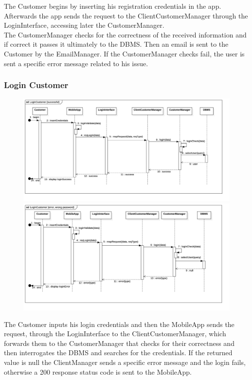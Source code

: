The Customer begins by inserting his registration credentials in the app. Afterwards the app sends the request to the ClientCustomerManager through the LoginInterface, accessing later the CustomerManager.\\
The CustomerManager checks for the correctness of the received information and if correct it passes it ultimately to the DBMS. Then an email is sent to the Customer by the EmailManager. If the CustomerManager checks fail, the user is sent a specific error message related to his issue.
\subsubsection{Login Customer}\label{cust_login}
\begin{figure}[H]
    \begin{center}
        \includegraphics[width=\textwidth]{img/runtime/cust_login_success}
        \includegraphics[width=\textwidth]{img/runtime/cust_login_error}
    \end{center}
\end{figure}
The Customer inputs his login credentials and then the MobileApp sends the request, through the LoginInterface to the ClientCustomerManager, which forwards them to the CustomerManager that checks for their correctness and then interrogates the DBMS and searches for the credentials. If the returned value is null the ClientManager sends a specific error message and the login fails, otherwise a 200 response status code is sent to the MobileApp.
